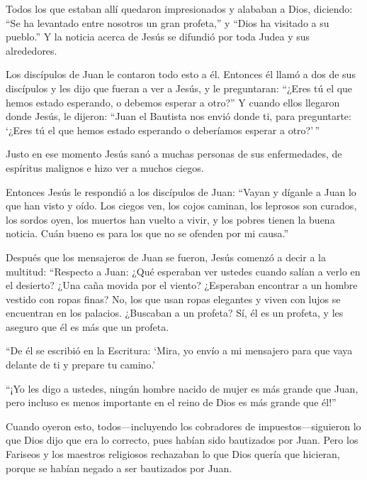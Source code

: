  Todos los que estaban allí quedaron impresionados y
alababan a Dios, diciendo: ``Se ha levantado entre nosotros un gran
profeta,'' y ``Dios ha visitado a su pueblo.''  Y la
noticia acerca de Jesús se difundió por toda Judea y sus alrededores.

 Los discípulos de Juan le contaron todo esto a él.
 Entonces él llamó a dos de sus discípulos y les dijo que
fueran a ver a Jesús, y le preguntaran: ``¿Eres tú el que hemos estado
esperando, o debemos esperar a otro?''  Y cuando ellos
llegaron donde Jesús, le dijeron: ``Juan el Bautista nos envió donde ti,
para preguntarte: `¿Eres tú el que hemos estado esperando o deberíamos
esperar a otro?'\,''

 Justo en ese momento Jesús sanó a muchas personas de sus
enfermedades, de espíritus malignos e hizo ver a muchos ciegos.

 Entonces Jesús le respondió a los discípulos de Juan:
``Vayan y díganle a Juan lo que han visto y oído. Los ciegos ven, los
cojos caminan, los leprosos son curados, los sordos oyen, los muertos
han vuelto a vivir, y los pobres tienen la buena noticia. 
Cuán bueno es para los que no se ofenden por mi causa.''

 Después que los mensajeros de Juan se fueron, Jesús
comenzó a decir a la multitud: ``Respecto a Juan: ¿Qué esperaban ver
ustedes cuando salían a verlo en el desierto? ¿Una caña movida por el
viento?  ¿Esperaban encontrar a un hombre vestido con ropas
finas? No, los que usan ropas elegantes y viven con lujos se encuentran
en los palacios.  ¿Buscaban a un profeta? Sí, él es un
profeta, y les aseguro que él es más que un profeta.

 ``De él se escribió en la Escritura: `Mira, yo envío a mi
mensajero para que vaya delante de ti y prepare tu camino.'

 ``¡Yo les digo a ustedes, ningún hombre nacido de mujer es
más grande que Juan, pero incluso es menos importante en el reino de
Dios es más grande que él!''

 Cuando oyeron esto, todos---incluyendo los cobradores de
impuestos---siguieron lo que Dios dijo que era lo correcto, pues habían
sido bautizados por Juan.  Pero los Fariseos y los maestros
religiosos rechazaban lo que Dios quería que hicieran, porque se habían
negado a ser bautizados por Juan.


